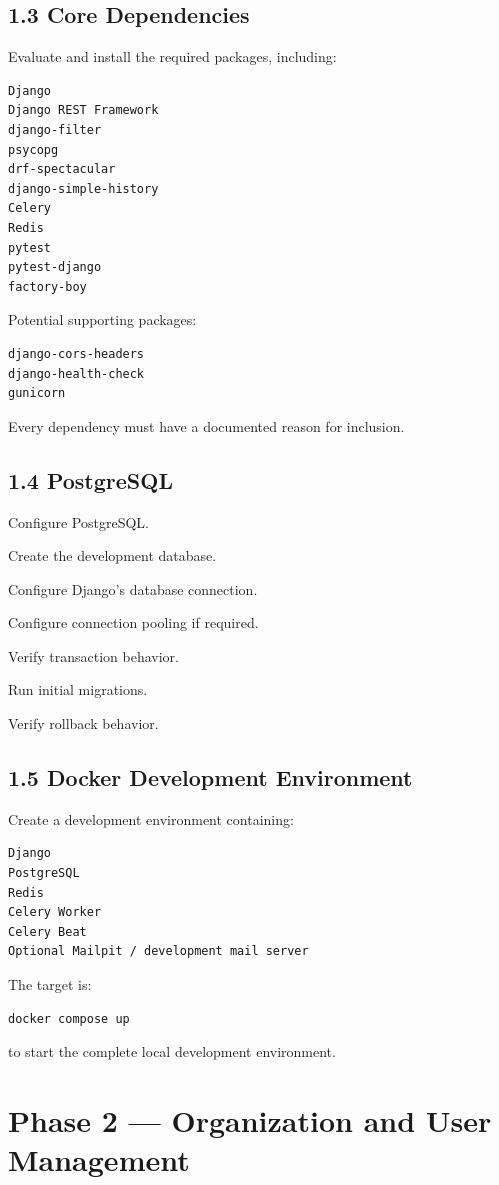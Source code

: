 \documentclass[11pt,a4paper]{article}
\newcommand{\task}[1]{\item[$\square$] #1}
\begin{document}
\subsection{1.3 Core Dependencies}

Evaluate and install the required packages, including:

\begin{lstlisting}
Django
Django REST Framework
django-filter
psycopg
drf-spectacular
django-simple-history
Celery
Redis
pytest
pytest-django
factory-boy
\end{lstlisting}

Potential supporting packages:

\begin{lstlisting}
django-cors-headers
django-health-check
gunicorn
\end{lstlisting}

Every dependency must have a documented reason for inclusion.

\subsection{1.4 PostgreSQL}

\task{Configure PostgreSQL.}
\task{Create the development database.}
\task{Configure Django's database connection.}
\task{Configure connection pooling if required.}
\task{Verify transaction behavior.}
\task{Run initial migrations.}
\task{Verify rollback behavior.}

\subsection{1.5 Docker Development Environment}

Create a development environment containing:

\begin{lstlisting}
Django
PostgreSQL
Redis
Celery Worker
Celery Beat
Optional Mailpit / development mail server
\end{lstlisting}

The target is:

\begin{lstlisting}
docker compose up
\end{lstlisting}

to start the complete local development environment.

\section{Phase 2 --- Organization and User Management}
\end{document}
